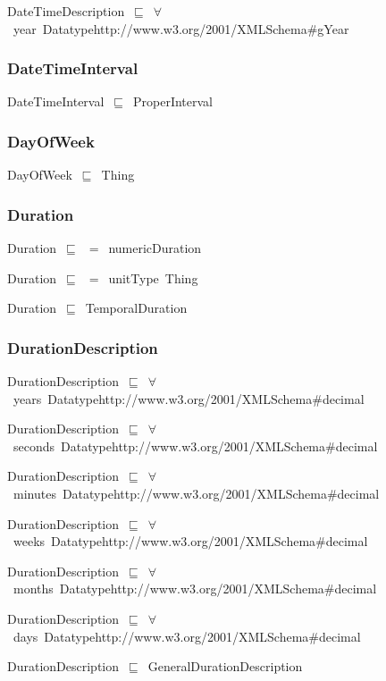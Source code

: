 \documentclass{article}
\begin{document}
DateTimeDescription~\ensuremath{\sqsubseteq}~\ensuremath{\forall}~year~Datatypehttp://www.w3.org/2001/XMLSchema#gYear~

\subsubsection*{DateTimeInterval}

DateTimeInterval~\ensuremath{\sqsubseteq}~ProperInterval~

\subsubsection*{DayOfWeek}

DayOfWeek~\ensuremath{\sqsubseteq}~Thing~

\subsubsection*{Duration}

Duration~\ensuremath{\sqsubseteq}~\ensuremath{=}~numericDuration~

Duration~\ensuremath{\sqsubseteq}~\ensuremath{=}~unitType~Thing~

Duration~\ensuremath{\sqsubseteq}~TemporalDuration~

\subsubsection*{DurationDescription}

DurationDescription~\ensuremath{\sqsubseteq}~\ensuremath{\forall}~years~Datatypehttp://www.w3.org/2001/XMLSchema#decimal~

DurationDescription~\ensuremath{\sqsubseteq}~\ensuremath{\forall}~seconds~Datatypehttp://www.w3.org/2001/XMLSchema#decimal~

DurationDescription~\ensuremath{\sqsubseteq}~\ensuremath{\forall}~minutes~Datatypehttp://www.w3.org/2001/XMLSchema#decimal~

DurationDescription~\ensuremath{\sqsubseteq}~\ensuremath{\forall}~weeks~Datatypehttp://www.w3.org/2001/XMLSchema#decimal~

DurationDescription~\ensuremath{\sqsubseteq}~\ensuremath{\forall}~months~Datatypehttp://www.w3.org/2001/XMLSchema#decimal~

DurationDescription~\ensuremath{\sqsubseteq}~\ensuremath{\forall}~days~Datatypehttp://www.w3.org/2001/XMLSchema#decimal~

DurationDescription~\ensuremath{\sqsubseteq}~GeneralDurationDescription~
\end{document}
